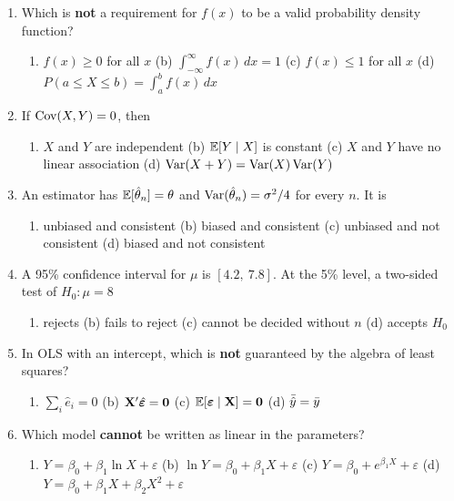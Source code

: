 \documentclass[11pt]{article}
\begin{document}
\begin{enumerate}[label=\textbf{A\arabic*.},leftmargin=*]
\item Which is \textbf{not} a requirement for $f(x)$ to be a valid probability density function?
  \begin{enumerate}[label=(\alph*)]
  \item $f(x)\ge0$ for all $x$ \quad (b) $\int_{-\infty}^{\infty}f(x)\,dx=1$ \quad (c) $f(x)\le1$ for all $x$ \quad (d) $P(a\le X\le b)=\int_a^bf(x)\,dx$
  \end{enumerate}

\item If $\operatorname{Cov}(X,Y)=0$, then
  \begin{enumerate}[label=(\alph*)]
  \item $X$ and $Y$ are independent \quad (b) $\mathbb{E}[Y\mid X]$ is constant \quad (c) $X$ and $Y$ have no linear association \quad (d) $\operatorname{Var}(X+Y)=\operatorname{Var}(X)\operatorname{Var}(Y)$
  \end{enumerate}

\item An estimator has $\mathbb{E}[\hat\theta_n]=\theta$ and $\operatorname{Var}(\hat\theta_n)=\sigma^2/4$ for every $n$. It is
  \begin{enumerate}[label=(\alph*)]
  \item unbiased and consistent \quad (b) biased and consistent \quad (c) unbiased and not consistent \quad (d) biased and not consistent
  \end{enumerate}

\item A 95\% confidence interval for $\mu$ is $[4.2,\ 7.8]$. At the 5\% level, a two-sided test of $H_0:\mu=8$
  \begin{enumerate}[label=(\alph*)]
  \item rejects \quad (b) fails to reject \quad (c) cannot be decided without $n$ \quad (d) accepts $H_0$
  \end{enumerate}

\item In OLS with an intercept, which is \textbf{not} guaranteed by the algebra of least squares?
  \begin{enumerate}[label=(\alph*)]
  \item $\sum_i\hat e_i=0$ \quad (b) $\mathbf{X}'\hat{\bm{\varepsilon}}=\mathbf0$ \quad (c) $\mathbb{E}[\bm{\varepsilon}\mid\mathbf{X}]=\mathbf0$ \quad (d) $\bar{\hat y}=\bar{y}$
  \end{enumerate}

\item Which model \textbf{cannot} be written as linear in the parameters?
  \begin{enumerate}[label=(\alph*)]
  \item $Y=\beta_0+\beta_1\ln X+\varepsilon$ \quad (b) $\ln Y=\beta_0+\beta_1X+\varepsilon$ \quad (c) $Y=\beta_0+e^{\beta_1X}+\varepsilon$ \quad (d) $Y=\beta_0+\beta_1X+\beta_2X^2+\varepsilon$
  \end{enumerate}


\end{enumerate}
\end{document}
